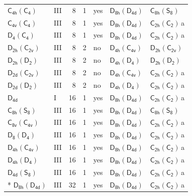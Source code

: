 \documentclass[10pt,a4paper]{article}
\numberwithin{equation}{section}
\newcommand{\grp}[1]{\mathsf{#1}}
\newcommand{\clsletter}[1]{\,{\scriptsize\color{black!55}#1}}
\begin{document}
{\begin{longtable}{@{}llrrlll@{}}
\href{C4h-C4.pdf}{$\grp{C_{4h}}(\grp{C_{4}})$} & III & 8 & 1 & yes & \href{D8h-D4d.pdf}{$\grp{D_{8h}}(\grp{D_{4d}})$} & \href{C8h-S8.pdf}{$\grp{C_{8h}}(\grp{S_{8}})$}\\
\href{C4v-C4.pdf}{$\grp{C_{4v}}(\grp{C_{4}})$} & III & 8 & 1 & yes & \href{D8h-D4d.pdf}{$\grp{D_{8h}}(\grp{D_{4d}})$} & \href{C2h-C2.pdf}{$\grp{C_{2h}}(\grp{C_{2}})$}\clsletter{a}\\
\href{D4-C4.pdf}{$\grp{D_{4}}(\grp{C_{4}})$} & III & 8 & 1 & yes & \href{D8h-D4d.pdf}{$\grp{D_{8h}}(\grp{D_{4d}})$} & \href{C2h-C2.pdf}{$\grp{C_{2h}}(\grp{C_{2}})$}\clsletter{a}\\
\href{D2h-C2v.pdf}{$\grp{D_{2h}}(\grp{C_{2v}})$} & III & 8 & 2 & no & \href{D4h-C4v.pdf}{$\grp{D_{4h}}(\grp{C_{4v}})$} & \href{D2h-C2v.pdf}{$\grp{D_{2h}}(\grp{C_{2v}})$}\\
\href{D2h-D2.pdf}{$\grp{D_{2h}}(\grp{D_{2}})$} & III & 8 & 2 & no & \href{D4h-D4.pdf}{$\grp{D_{4h}}(\grp{D_{4}})$} & \href{D2h-D2.pdf}{$\grp{D_{2h}}(\grp{D_{2}})$}\\
\href{D2d-C2v.pdf}{$\grp{D_{2d}}(\grp{C_{2v}})$} & III & 8 & 2 & no & \href{D4h-C4v.pdf}{$\grp{D_{4h}}(\grp{C_{4v}})$} & \href{C2h-C2.pdf}{$\grp{C_{2h}}(\grp{C_{2}})$}\clsletter{a}\\
\href{D2d-D2.pdf}{$\grp{D_{2d}}(\grp{D_{2}})$} & III & 8 & 2 & no & \href{D4h-D4.pdf}{$\grp{D_{4h}}(\grp{D_{4}})$} & \href{C2h-C2.pdf}{$\grp{C_{2h}}(\grp{C_{2}})$}\clsletter{a}\\
\href{../../../rotation/data/pdf/D4d.pdf}{$\grp{D_{4d}}$} & I & 16 & 1 & yes & \href{D8h-D4d.pdf}{$\grp{D_{8h}}(\grp{D_{4d}})$} & \href{C2h-C2.pdf}{$\grp{C_{2h}}(\grp{C_{2}})$}\clsletter{a}\\
\href{C8h-S8.pdf}{$\grp{C_{8h}}(\grp{S_{8}})$} & III & 16 & 1 & yes & \href{D8h-D4d.pdf}{$\grp{D_{8h}}(\grp{D_{4d}})$} & \href{C8h-S8.pdf}{$\grp{C_{8h}}(\grp{S_{8}})$}\\
\href{C8v-C4v.pdf}{$\grp{C_{8v}}(\grp{C_{4v}})$} & III & 16 & 1 & yes & \href{D8h-D4d.pdf}{$\grp{D_{8h}}(\grp{D_{4d}})$} & \href{C2h-C2.pdf}{$\grp{C_{2h}}(\grp{C_{2}})$}\clsletter{a}\\
\href{D8-D4.pdf}{$\grp{D_{8}}(\grp{D_{4}})$} & III & 16 & 1 & yes & \href{D8h-D4d.pdf}{$\grp{D_{8h}}(\grp{D_{4d}})$} & \href{C2h-C2.pdf}{$\grp{C_{2h}}(\grp{C_{2}})$}\clsletter{a}\\
\href{D4h-C4v.pdf}{$\grp{D_{4h}}(\grp{C_{4v}})$} & III & 16 & 1 & yes & \href{D8h-D4d.pdf}{$\grp{D_{8h}}(\grp{D_{4d}})$} & \href{C2h-C2.pdf}{$\grp{C_{2h}}(\grp{C_{2}})$}\clsletter{a}\\
\href{D4h-D4.pdf}{$\grp{D_{4h}}(\grp{D_{4}})$} & III & 16 & 1 & yes & \href{D8h-D4d.pdf}{$\grp{D_{8h}}(\grp{D_{4d}})$} & \href{C2h-C2.pdf}{$\grp{C_{2h}}(\grp{C_{2}})$}\clsletter{a}\\
\href{D4d-S8.pdf}{$\grp{D_{4d}}(\grp{S_{8}})$} & III & 16 & 1 & yes & \href{D8h-D4d.pdf}{$\grp{D_{8h}}(\grp{D_{4d}})$} & \href{C2h-C2.pdf}{$\grp{C_{2h}}(\grp{C_{2}})$}\clsletter{a}\\*
\href{D8h-D4d.pdf}{$\grp{D_{8h}}(\grp{D_{4d}})$} & III & 32 & 1 & yes & \href{D8h-D4d.pdf}{$\grp{D_{8h}}(\grp{D_{4d}})$} & \href{C2h-C2.pdf}{$\grp{C_{2h}}(\grp{C_{2}})$}\clsletter{a}\\
\bottomrule\end{longtable}}
\end{document}
